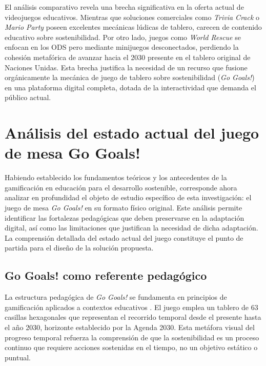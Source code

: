 El análisis comparativo revela una brecha significativa en la oferta actual de videojuegos educativos. Mientras que soluciones comerciales como \textit{Trivia Crack} o \textit{Mario Party} poseen excelentes mecánicas lúdicas de tablero, carecen de contenido educativo sobre sostenibilidad. Por otro lado, juegos como \textit{World Rescue} se enfocan en los ODS pero mediante minijuegos desconectados, perdiendo la cohesión metafórica de avanzar hacia el 2030 presente en el tablero original de Naciones Unidas. Esta brecha justifica la necesidad de un recurso que fusione orgánicamente la mecánica de juego de tablero sobre sostenibilidad (\textit{Go Goals!}) en una plataforma digital completa, dotada de la interactividad que demanda el público actual.

\section{Análisis del estado actual del juego de mesa Go Goals!}
\label{sec:analisis_gogals}

Habiendo establecido los fundamentos teóricos y los antecedentes de la gamificación en educación para el desarrollo sostenible, corresponde ahora analizar en profundidad el objeto de estudio específico de esta investigación: el juego de mesa \textit{Go Goals!} en su formato físico original. Este análisis permite identificar las fortalezas pedagógicas que deben preservarse en la adaptación digital, así como las limitaciones que justifican la necesidad de dicha adaptación. La comprensión detallada del estado actual del juego constituye el punto de partida para el diseño de la solución propuesta.

\subsection{Go Goals! como referente pedagógico}
\label{subsec:gogals_referente}

La estructura pedagógica de \textit{Go Goals!} se fundamenta en principios de gamificación aplicados a contextos educativos \parencite{GoGoals2020}. El juego emplea un tablero de 63 casillas hexagonales que representan el recorrido temporal desde el presente hasta el año 2030, horizonte establecido por la Agenda 2030. Esta metáfora visual del progreso temporal refuerza la comprensión de que la sostenibilidad es un proceso continuo que requiere acciones sostenidas en el tiempo, no un objetivo estático o puntual.

